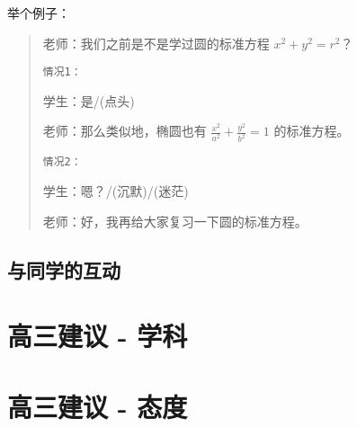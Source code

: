 \documentclass[UTF8,11pt,a4paper]{ctexart}
\begin{document}
				举个例子：
				
				\begin{quote}
					老师：我们之前是不是学过圆的标准方程 $x^2+y^2=r^2$？
					
					\texttt{情况1：}
					
					学生：是/(点头)
					
					老师：那么类似地，椭圆也有 $\frac{x^2}{a^2}+\frac{y^2}{b^2}=1$ 的标准方程。
					
					\texttt{情况2：}
					
					学生：嗯？/(沉默)/(迷茫)
					
					老师：好，我再给大家复习一下圆的标准方程。
					
				\end{quote}
		\subsection{与同学的互动}
	\section{高三建议 - 学科}
	
	\section{高三建议 - 态度}%
\end{document}

